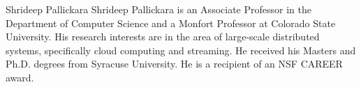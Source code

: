 \documentclass[9pt,journal,compsoc]{IEEEtran}
\begin{document}
%
\vspace{-2cm}
\begin{IEEEbiography}{Shrideep Pallickara}
Shrideep Pallickara is an Associate Professor in the Department of Computer Science and a Monfort Professor at Colorado State University. His research interests are in the area of large-scale distributed systems, specifically cloud computing and streaming. He received his Masters and Ph.D. degrees from Syracuse University. He is a recipient of an NSF CAREER award.
\end{IEEEbiography}
\end{document}
